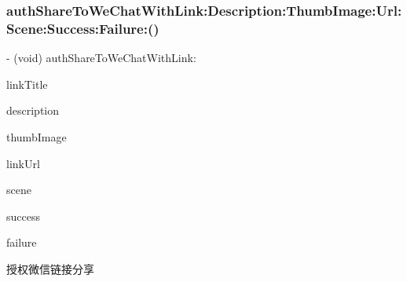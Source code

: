 \subsubsection{\texorpdfstring{auth\+Share\+To\+We\+Chat\+With\+Link\+:\+Description\+:\+Thumb\+Image\+:\+Url\+:\+Scene\+:\+Success\+:\+Failure\+:()}{authShareToWeChatWithLink:Description:ThumbImage:Url:Scene:Success:Failure:()}}
{\footnotesize\ttfamily -\/ (void) auth\+Share\+To\+We\+Chat\+With\+Link\+: \begin{DoxyParamCaption}\item[{(N\+S\+String $\ast$)}]{link\+Title }\item[{Description:(N\+S\+String $\ast$)}]{description }\item[{ThumbImage:(U\+I\+Image $\ast$)}]{thumb\+Image }\item[{Url:(N\+S\+String $\ast$)}]{link\+Url }\item[{Scene:(Share\+To\+W\+X\+Scene)}]{scene }\item[{Success:(B\+Q\+L\+Auth\+Success\+Block)}]{success }\item[{Failure:(B\+Q\+L\+Auth\+Failure\+Block)}]{failure }\end{DoxyParamCaption}}

授权微信链接分享


